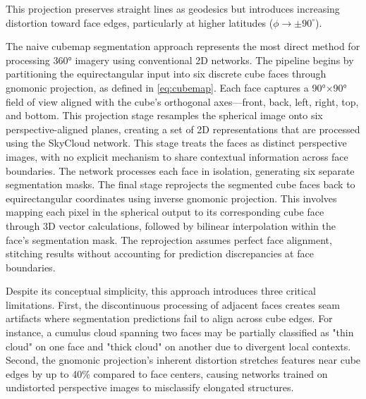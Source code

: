 This projection preserves straight lines as geodesics but introduces increasing distortion toward face edges, particularly at higher latitudes (\(\phi \rightarrow \pm90^\circ\)).

The naive cubemap segmentation approach represents the most direct method for processing 360° imagery using conventional 2D networks. 
The pipeline begins by partitioning the equirectangular input into six discrete cube faces through gnomonic projection, as defined in \autoref{eq:cubemap}. 
Each face captures a 90°×90° field of view aligned with the cube's orthogonal axes—front, back, left, right, top, and bottom. 
This projection stage resamples the spherical image onto six perspective-aligned planes, creating a set of 2D representations that are processed using the SkyCloud network.
This stage treats the faces as distinct perspective images, with no explicit mechanism to share contextual information across face boundaries. 
The network processes each face in isolation, generating six separate segmentation masks. %
The final stage reprojects the segmented cube faces back to equirectangular coordinates using inverse gnomonic projection. 
This involves mapping each pixel in the spherical output to its corresponding cube face through 3D vector calculations, followed by bilinear interpolation within the face's segmentation mask. 
The reprojection assumes perfect face alignment, stitching results without accounting for prediction discrepancies at face boundaries.

Despite its conceptual simplicity, this approach introduces three critical limitations. 
First, the discontinuous processing of adjacent faces creates seam artifacts where segmentation predictions fail to align across cube edges.
For instance, a cumulus cloud spanning two faces may be partially classified as "thin cloud" on one face and "thick cloud" on another due to divergent local contexts. 
Second, the gnomonic projection's inherent distortion stretches features near cube edges by up to 40\% compared to face centers, causing networks trained on undistorted perspective images to misclassify elongated structures. 


